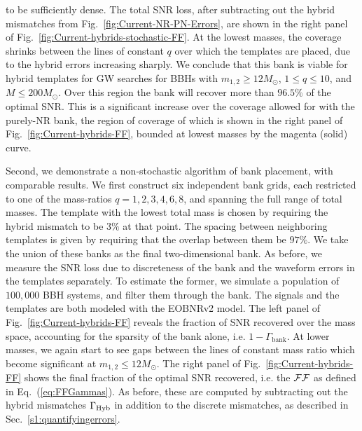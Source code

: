 to be sufficiently dense. The total SNR loss, after subtracting out 
the hybrid mismatches from Fig.~\ref{fig:Current-NR-PN-Errors}, are shown in 
the right panel of Fig.~\ref{fig:Current-hybrids-stochastic-FF}. 
At the lowest masses, the coverage shrinks between the lines of constant $q$ 
over which the templates are placed, due to the hybrid errors increasing 
sharply. We conclude that this bank is viable for hybrid templates for GW 
searches for BBHs with $m_{1,2}\geq 12M_\odot$, $1\leq q\leq 10$, and 
$M\leq 200M_\odot$. Over this region the bank will recover more than $96.5\%$
of the optimal SNR. This is a significant increase over the coverage allowed 
for with the purely-NR bank, the region of coverage of which is shown in the 
right panel of Fig.~\ref{fig:Current-hybrids-FF}, bounded at lowest masses by 
the magenta (solid) curve.


Second, we demonstrate a non-stochastic algorithm of bank placement, with 
comparable results. We first construct six independent bank grids, each
restricted to one of the mass-ratios $q=1,2,3,4,6,8$, and spanning the full 
range of total masses. The template with the lowest total mass is chosen 
by requiring the hybrid mismatch to be $3\%$ at that point.
The spacing between neighboring templates is
given by requiring that the overlap between them be $97\%$. 
We take the union of these banks as the final 
two-dimensional bank. As before, we measure the SNR loss due to discreteness of
the bank and the waveform errors in the templates separately. To estimate the
former, we simulate a population of $100,000$ BBH systems, and filter
them through the bank. The signals and the templates are both modeled
with the EOBNRv2 model. The left panel of Fig.~\ref{fig:Current-hybrids-FF}
reveals the fraction of SNR recovered over the mass space, accounting for the 
sparsity of the bank alone, i.e. $1-\Gamma_\mathrm{bank}$. At lower masses, 
we again start to see gaps between the lines of constant mass ratio which
become significant at $m_{1,2} \leq 12M_\odot$. 
The right panel of Fig.~\ref{fig:Current-hybrids-FF} shows the final fraction 
of the optimal SNR recovered, i.e. the $\mathcal{FF}$ as defined in Eq.~(\ref{eq:FFGammas}). 
As before, these are computed by subtracting out the hybrid mismatches 
$\Gamma_{\mathrm{Hyb}}$ in addition to the discrete mismatches, as described in
Sec.~\ref{s1:quantifyingerrors}. 

